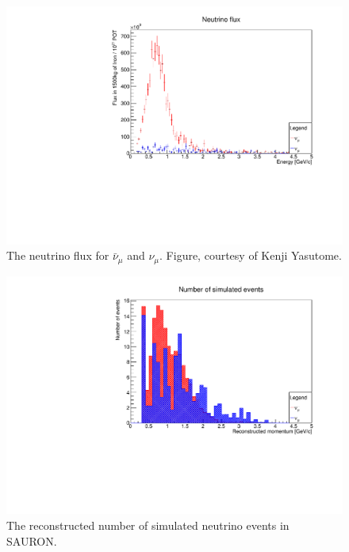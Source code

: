 

\begin{figure}[h!]
\centering
\includegraphics[width=.9\textwidth]{figures/NeutrinoChap/FluxSpectrum.pdf}
\caption{The neutrino flux for $\bar{\nu}_\mu$ and $\nu_\mu$. Figure, courtesy of Kenji Yasutome.}
\label{fig:SimuFlux}
\end{figure}

\begin{figure}[h!]
\centering
\includegraphics[width=.9\textwidth]{figures/NeutrinoChap/NumSimEvents.pdf}
\caption{The reconstructed number of simulated neutrino events in SAURON.}
\label{fig:NumSim}
\end{figure}
\fi

